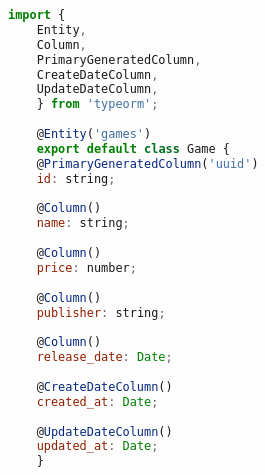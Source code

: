 \begin{lstlisting}[language=JavaScript, caption={A Entidade Game.ts},captionpos=b, label=alg:game]
import {
    Entity,
    Column,
    PrimaryGeneratedColumn,
    CreateDateColumn,
    UpdateDateColumn,
    } from 'typeorm';
    
    @Entity('games')
    export default class Game {
    @PrimaryGeneratedColumn('uuid')
    id: string;
    
    @Column()
    name: string;
    
    @Column()
    price: number;
    
    @Column()
    publisher: string;
    
    @Column()
    release_date: Date;
    
    @CreateDateColumn()
    created_at: Date;
    
    @UpdateDateColumn()
    updated_at: Date;
    }
\end{lstlisting}

